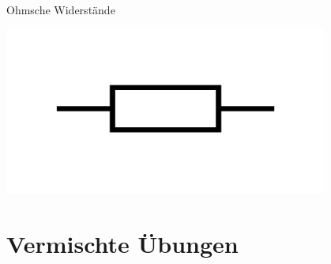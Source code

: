 \begin{zsfg}{Ohmsche Widerstände}
\begin{minipage}{0.33\textwidth}
\begin{minipage}{0.55\textwidth}
		\end{minipage}
		\hfill
		\begin{minipage}{0.43\textwidth}
			\centering
			\includegraphics[width=0.8\textwidth]{./Zeichnungen/widerstand-schaltsymbol.png}
		\end{minipage}
	\end{minipage}
\end{zsfg}


\newpage
\section{Vermischte Übungen}


